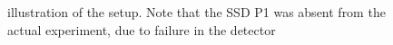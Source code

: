 \begin{figure}[h]
	\caption{illustration of the setup. Note that the SSD P1 was absent from the actual experiment, due to failure in the detector}
	\label{fig:opstilling}
\end{figure}

